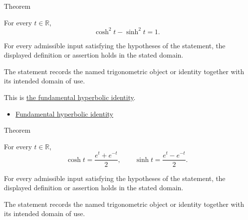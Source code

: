 \begin{theorembox}{Theorem}
\begin{theorem}
\label{thm:hyperbolic-pythagorean-identity}
For every $t\in\mathbb{R}$,
\[
  \cosh^2 t-\sinh^2 t=1.
\]
\end{theorem}
\end{theorembox}
\begin{remark*}
For every admissible input satisfying the hypotheses of the statement, the
displayed definition or assertion holds in the stated domain.
\end{remark*}

\begin{remark*}[Interpretation]
The statement records the named trigonometric object or identity together with
its intended domain of use.
\end{remark*}

\begin{remark*}[Proof]
This is \hyperref[thm:fundamental-hyperbolic-identity]{the fundamental
hyperbolic identity}.
\end{remark*}
\begin{dependencies}
\begin{itemize}
  \item \hyperref[thm:fundamental-hyperbolic-identity]{Fundamental hyperbolic identity}
\end{itemize}
\end{dependencies}

\begin{theorembox}{Theorem}
\begin{theorem}
\label{thm:hyperbolic-exponential-form}
For every $t\in\mathbb{R}$,
\[
  \cosh t=\frac{e^t+e^{-t}}{2},
  \qquad
  \sinh t=\frac{e^t-e^{-t}}{2}.
\]
\end{theorem}
\end{theorembox}
\begin{remark*}
For every admissible input satisfying the hypotheses of the statement, the
displayed definition or assertion holds in the stated domain.
\end{remark*}

\begin{remark*}[Interpretation]
The statement records the named trigonometric object or identity together with
its intended domain of use.
\end{remark*}

